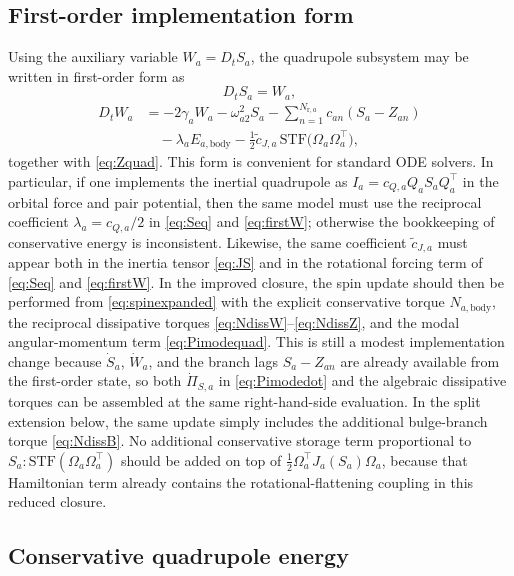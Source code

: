 \documentclass[journal, a4paper]{IEEEtran}
\begin{document}
\subsection{First-order implementation form}

Using the auxiliary variable $W_a=D_t S_a$, the quadrupole subsystem may be
written in first-order form as
\begin{equation}
D_t S_a = W_a,
\label{eq:firstS}
\end{equation}
\begin{align}
D_t W_a
&=
-2\gamma_a W_a
-\omega_{a2}^2 S_a
-\sum_{n=1}^{N_{\mathrm{r},a}}
c_{an}(S_a-Z_{an})
\nonumber\\
&\quad
-\lambda_a E_{a,\mathrm{body}}
-\frac{1}{2}\tilde c_{J,a}\,
\mathrm{STF}
\bigl(
\Omega_a\Omega_a^\top
\bigr),
\label{eq:firstW}
\end{align}
together with \eqref{eq:Zquad}. This form is convenient for standard ODE
solvers. In particular, if one implements the inertial quadrupole as
$I_a=c_{Q,a}Q_aS_aQ_a^\top$ in the orbital force and pair potential,
then the same model must use the reciprocal coefficient
$\lambda_a=c_{Q,a}/2$ in \eqref{eq:Seq} and \eqref{eq:firstW}; otherwise the
bookkeeping of conservative energy is inconsistent. Likewise, the same
coefficient $\tilde c_{J,a}$ must appear both in the inertia tensor
\eqref{eq:JS} and in the rotational forcing term of \eqref{eq:Seq} and
\eqref{eq:firstW}. In the improved closure, the spin update should then be
performed from \eqref{eq:spinexpanded} with the explicit conservative torque
$N_{a,\mathrm{body}}$, the reciprocal dissipative torques
\eqref{eq:NdissW}--\eqref{eq:NdissZ}, and the modal angular-momentum term
\eqref{eq:Pimodequad}. This is still a modest implementation change because
$\dot S_a$, $\dot W_a$, and the branch lags $S_a-Z_{an}$ are already available
from the first-order state, so both $\dot\Pi_{S,a}$ in \eqref{eq:Pimodedot} and
the algebraic dissipative torques can be assembled at the same right-hand-side
evaluation. In the split extension below, the same update simply includes the
additional bulge-branch torque \eqref{eq:NdissB}. No additional conservative
storage term
proportional to $S_a:\mathrm{STF}(\Omega_a\Omega_a^\top)$ should be added on top of
$\tfrac12\Omega_a^\top J_a(S_a)\Omega_a$, because that Hamiltonian term
already contains the rotational-flattening coupling in this reduced closure.

\subsection{Conservative quadrupole energy}
\end{document}
